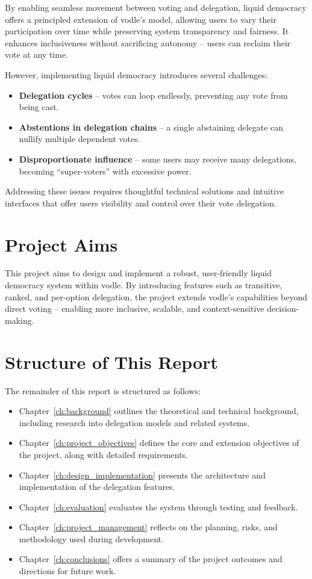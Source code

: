 By enabling seamless movement between voting and delegation, liquid democracy offers a principled extension of vodle's model, allowing users to vary their participation over time while preserving system transparency and fairness. It enhances inclusiveness without sacrificing autonomy -- users can reclaim their vote at any time.

However, implementing liquid democracy introduces several challenges:
\begin{itemize}
  \item \textbf{Delegation cycles} -- votes can loop endlessly, preventing any vote from being cast.
  \item \textbf{Abstentions in delegation chains} -- a single abstaining delegate can nullify multiple dependent votes.
  \item \textbf{Disproportionate influence} -- some users may receive many delegations, becoming ``super-voters'' with excessive power.
\end{itemize}

Addressing these issues requires thoughtful technical solutions and intuitive interfaces that offer users visibility and control over their vote delegation.

\section{Project Aims}

This project aims to design and implement a robust, user-friendly liquid democracy system within vodle. By introducing features such as transitive, ranked, and per-option delegation, the project extends vodle's capabilities beyond direct voting -- enabling more inclusive, scalable, and context-sensitive decision-making.

\section{Structure of This Report}

The remainder of this report is structured as follows:

\begin{itemize}
  \item Chapter~\ref{ch:background} outlines the theoretical and technical background, including research into delegation models and related systems.
  \item Chapter~\ref{ch:project_objectives} defines the core and extension objectives of the project, along with detailed requirements.
  \item Chapter~\ref{ch:design_implementation} presents the architecture and implementation of the delegation features.
  \item Chapter~\ref{ch:evaluation} evaluates the system through testing and feedback.
  \item Chapter~\ref{ch:project_management} reflects on the planning, risks, and methodology used during development.
  \item Chapter~\ref{ch:conclusions} offers a summary of the project outcomes and directions for future work.
\end{itemize}
